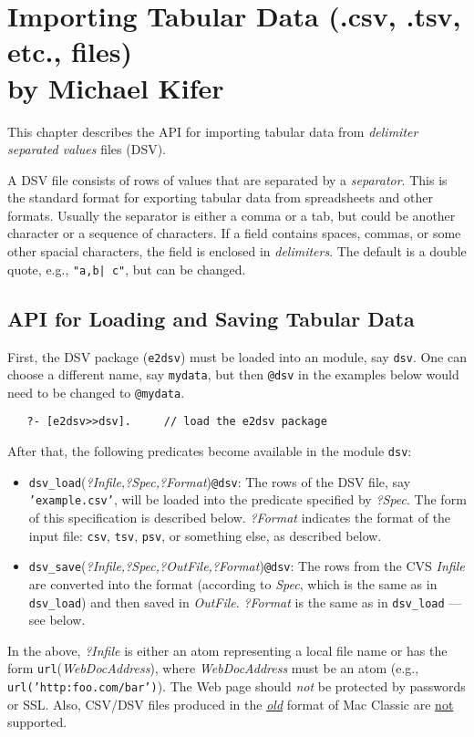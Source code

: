 \chapter[Importing Tabular Data (DSV, TSV, etc.)]
{Importing Tabular Data (.csv, .tsv, etc., files)\\
  {\Large by Michael Kifer}}


This chapter describes the \ERGO API for importing tabular data from
\emph{delimiter separated values} files (DSV).  

A DSV file consists of rows of values that are separated by a \emph{separator}.
This is the standard format for exporting tabular data from spreadsheets
and other formats. Usually the separator is either a comma or a tab, but
could be another character or a sequence of characters.
If a field contains spaces, commas, or some other spacial characters,
the field is enclosed in \emph{delimiters}. The default is a double quote,
e.g., \texttt{"a,b| c"}, but can be changed.   

\section{API for Loading and Saving Tabular Data}

First, the DSV package (\texttt{e2dsv}) must be loaded into an \ERGO
module, say \texttt{dsv}.
One can choose a different name, say
\texttt{mydata}, but then \texttt{@dsv} in the examples below would need to
be changed to \texttt{@mydata}.
\begin{verbatim}
   ?- [e2dsv>>dsv].     // load the e2dsv package
\end{verbatim}
After that, the following predicates become available in the module
\texttt{dsv}:
\begin{itemize} \label{pg-dsvload}
\item  \texttt{dsv\_load}(\emph{?Infile,?Spec,?Format})\texttt{@dsv}: 
  The rows of the DSV file, say \texttt{'example.csv'}, will be loaded into
  the predicate specified by \emph{?Spec}. The form of this specification
  is described below.
  \emph{?Format} indicates the format of the input file: \texttt{csv},
  \texttt{tsv}, \texttt{psv}, or something else, as described below.
\item
  \texttt{dsv\_save}(\emph{?Infile,?Spec,?OutFile,?Format})\texttt{@dsv}:
  The rows from the CVS \emph{Infile} are converted into the \ERGO format
  (according to \emph{Spec}, which is the same as in \texttt{dsv\_load})  
  and then saved in \emph{OutFile}. 
  \emph{?Format} is the same as in \texttt{dsv\_load} --- see below. 
\end{itemize}
  In the above, \emph{?Infile} is either an atom representing a local file name 
  or has the form \texttt{url}(\emph{WebDocAddress}), where
  \emph{WebDocAddress} must be an atom (e.g.,
  \texttt{url('http:foo.com/bar')}).
  The Web page should \emph{not} be protected by passwords or SSL.
  Also, CSV/DSV files produced in the \underline{\emph{old}} 
  format of Mac Classic
  are \underline{not} supported.  

